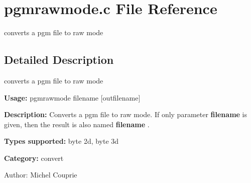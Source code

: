 \section{pgmrawmode.c File Reference}
\label{pgmrawmode_8c}
converts a pgm file to raw mode  




\label{_details}
\subsection{Detailed Description}
converts a pgm file to raw mode 

{\bf Usage:} pgmrawmode filename [outfilename]

{\bf Description:} Converts a pgm file to raw mode. If only parameter {\bf filename} is given, then the result is also named {\bf filename} .

{\bf Types supported:} byte 2d, byte 3d

{\bf Category:} convert

\begin{Desc}
\item[Author:]Michel Couprie \end{Desc}
